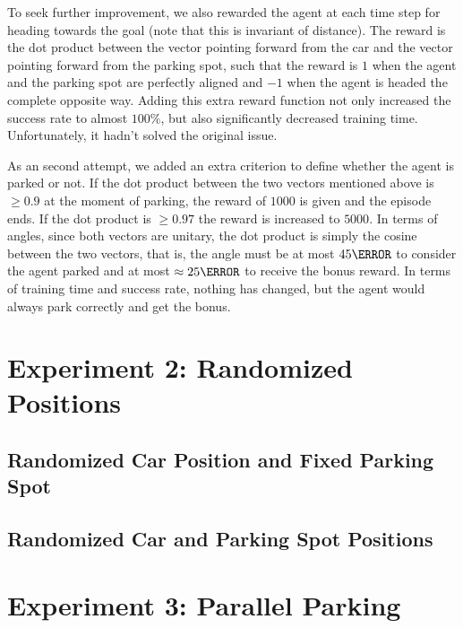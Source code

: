 To seek further improvement, we also rewarded the agent at each time step for heading towards the goal (note that this is invariant of distance). The reward is the dot product between the vector pointing forward from the car and the vector pointing forward from the parking spot, such that the reward is $1$ when the agent and the parking spot are perfectly aligned and $-1$ when the agent is headed the complete opposite way. Adding this extra reward function not only increased the success rate to almost $100\%$, but also significantly decreased training time. Unfortunately, it hadn't solved the original issue.

As an second attempt, we added an extra criterion to define whether the agent is parked or not. If the dot product between the two vectors mentioned above is $\geq 0.9$ at the moment of parking, the reward of $1000$ is given and the episode ends. If the dot product is $\geq 0.97$ the reward is increased to $5000$. In terms of angles, since both vectors are unitary, the dot product is simply the cosine between the two vectors, that is, the angle must be at most $45\degree$ to consider the agent parked and at most $\approx 25\degree$ to receive the bonus reward. In terms of training time and success rate, nothing has changed, but the agent would always park correctly and get the bonus.
\section{Experiment 2: Randomized Positions}
\subsection{Randomized Car Position and Fixed Parking Spot}
\subsection{Randomized Car and Parking Spot Positions}
\section{Experiment 3: Parallel Parking}